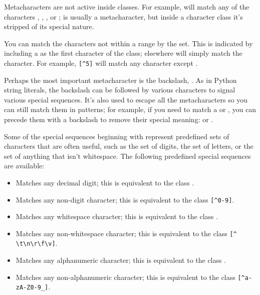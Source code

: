 \documentclass{howto}
\begin{document}
Metacharacters are not active inside classes.  For example,
\regexp{[akm\$]} will match any of the characters ,
, , or \character{\$}; \character{\$} is
usually a metacharacter, but inside a character class it's stripped of
its special nature.

You can match the characters not within a range by 
the set.  This is indicated by including a \character{\^} as the first
character of the class; \character{\^} elsewhere will simply match the
\character{\^} character.  For example, \verb|[^5]| will match any
character except .

Perhaps the most important metacharacter is the backslash, \samp{\e}.  
As in Python string literals, the backslash can be followed by various
characters to signal various special sequences.  It's also used to escape
all the metacharacters so you can still match them in patterns; for
example, if you need to match a \samp{[} or 
\samp{\e}, you can precede them with a backslash to remove their
special meaning: \regexp{\e[} or \regexp{\e\e}.

Some of the special sequences beginning with \character{\e} represent
predefined sets of characters that are often useful, such as the set
of digits, the set of letters, or the set of anything that isn't
whitespace.  The following predefined special sequences are available:

\begin{itemize}
\item[\code{\e d}]Matches any decimal digit; this is
equivalent to the class \regexp{[0-9]}.

\item[\code{\e D}]Matches any non-digit character; this is
equivalent to the class \verb|[^0-9]|.

\item[\code{\e s}]Matches any whitespace character; this is
equivalent to the class \regexp{[ \e t\e n\e r\e f\e v]}.

\item[\code{\e S}]Matches any non-whitespace character; this is
equivalent to the class \verb|[^ \t\n\r\f\v]|.

\item[\code{\e w}]Matches any alphanumeric character; this is equivalent to the class
\regexp{[a-zA-Z0-9_]}.  

\item[\code{\e W}]Matches any non-alphanumeric character; this is equivalent to the class
\verb|[^a-zA-Z0-9_]|.   
\end{itemize}
\end{document}
